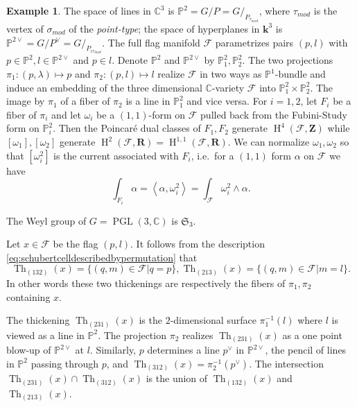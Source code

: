\documentclass[12pt]{amsbook}%
\theoremstyle{definition}
\newtheorem{example}[thm]{Example}
\theoremstyle{remark}
\numberwithin{section}{chapter}
\numberwithin{subsection}{section}
\numberwithin{figure}{chapter}
\DeclareMathOperator{\PGL}{PGL}
\DeclareMathOperator{\Th}{Th}
\DeclareMathOperator{\coh}{H}
\def\taumod{\tau_{mod}}
\def\simod{\sigma_{mod}}
\def\bC{{\mathbb{C}}}
\def\bP{{\mathbb{P}}}
\def\cF{{\mathscr{F}}}
\def\RR{{\mathbf{R}}}
\def\ZZ{{\mathbf{Z}}}
\def\fk{{\mathbf{k}}}
\def\Pc{{P^{\vee}}}
\begin{document}
{{\begin{example}\label{dimthreeflagexample1}
The space of lines in $\bC^3$ is $\bP^2=G/P=G/_{P_{\taumod}}$, where $\taumod$ is the vertex of $\simod$ of the {\em point-type}; 
the space of hyperplanes in $\fk^3$ is $\bP^{2\vee}=G/\Pc= G/_{P_{\iota\taumod}}$. 
The full flag manifold $\cF$ parametrizes pairs $(p,l)$ with $p\in \bP^2, l\in \bP^{2\vee}$ and $p\in l$. Denote $\bP^2$ and $\bP^{2\vee}$ by $\bP^2_1,\bP^2_2$. The two projections $\pi_1: (p,\lambda)\mapsto p$ and $\pi_2: (p,l)\mapsto l$ realize $\cF$ in two ways as $\bP^1$-bundle and induce an embedding of the three dimensional $\bC$-variety $\cF$ into $\bP^2_1\times \bP^{2}_2$. The image by $\pi_1$ of a fiber of $\pi_2$ is a line in $\bP^2_1$ and vice versa. For $i=1,2$, let $F_i$ be a fiber of $\pi_i$ and let $\omega_i$ be a $(1,1)$-form on $\cF$ pulled back from the Fubini-Study form on $\bP^2_i$. Then the Poincaré dual classes of $F_1,F_2$ generate $\coh^{4}(\cF,\ZZ)$ while $[\omega_1],[\omega_2]$ generate $\coh^{2}(\cF,\RR)=\coh^{1,1}(\cF,\RR)$. We can normalize $\omega_1,\omega_2$ so that $[\omega_i^2]$ is the current associated with $F_i$, i.e.\ for a $(1,1)$ form $\alpha$ on $\cF$ we have 
\[\int_{F_i}\alpha=\left\langle \alpha,\omega_i^2\right\rangle=\int_{\cF}\omega_i^2\wedge\alpha.\]

The Weyl group of $G=\PGL(3,\bC)$ is $\mathfrak{S}_3$. 


Let $x\in \cF$ be the flag $(p,l)$. It follows from the description \eqref{eq:schubertcelldescribedbypermutation} that 
\[\Th_{(132)}(x)=\{(q,m)\in \cF \vert q=p\}, \Th_{(213)}(x)=\{(q,m)\in \cF \vert m=l\}.\]
In other words these two thickenings are respectively the fibers of $\pi_1,\pi_2$ containing $x$.  

The thickening $\Th_{(231)}(x)$ is the $2$-dimensional surface $\pi_1^{-1}(l)$ where $l$ is viewed as a line in $\bP^2$. The projection $\pi_2$ realizes $\Th_{(231)}(x)$ as a one point blow-up of $\bP^{2\vee}$ at $l$. Similarly, $p$ determines a line $p^{\vee}$ in $\bP^{2\vee}$, the pencil of lines in $\bP^2$ passing through $p$, and $\Th_{(312)}(x)=\pi_2^{-1}(p^{\vee})$. The intersection $\Th_{(231)}(x)\cap \Th_{(312)}(x)$ is the union of $\Th_{(132)}(x)$ and $\Th_{(213)}(x)$.


\end{example}}}
\end{document}
